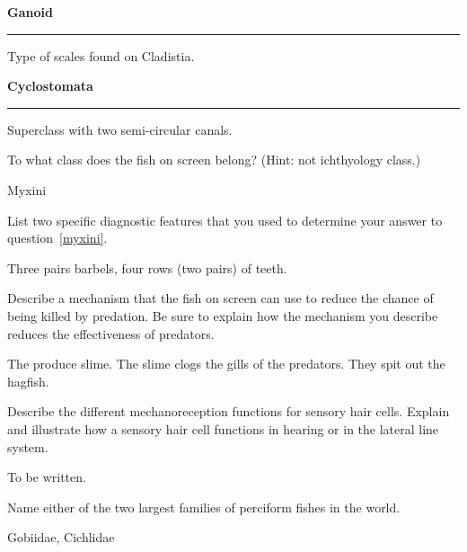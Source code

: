 \documentclass[11pt, addpoints]{exam}
\newcommand*\Matching[1]{
\ifprintanswers
	\textbf{#1}
\else
	\rule{2.1in}{0.5pt}
\fi
}
\newlength\matchlena
\newlength\matchlenb
\newcommand\MatchQuestion[2]{%
	\setlength\matchlenb{\linewidth}
	\addtolength\matchlenb{-\matchlena}
	\parbox[t]{\matchlena}{\Matching{#1}}\enspace\parbox[t]{\matchlenb}{#2}}
\begin{document}
\begin{questions}
\question\MatchQuestion{Ganoid}{Type of scales found on Cladistia.}
\vspace{0.5\baselineskip}

\question\MatchQuestion{Cyclostomata}{Superclass with two semi-circular canals.}
\vspace{0.5\baselineskip}

\newpage


\question[1]\label{myxini}
To what class does the fish on screen belong? (Hint: not ichthyology class.) 
\begin{solution}Myxini\end{solution}

\question[4]
List two specific diagnostic features that you used to determine your answer to question~\ref{myxini}.
\begin{solution}Three pairs barbels, four rows (two pairs) of teeth.\end{solution}


\question[4]
Describe a mechanism that the fish on screen can use to reduce the chance of being killed by predation.  Be sure to explain how the mechanism you describe reduces the effectiveness of predators.

\begin{solution}
The produce slime. The slime clogs the gills of the predators. They spit out the hagfish.
\end{solution}


\question[10]
Describe the different mechanoreception functions for sensory hair cells.  Explain and illustrate how a sensory hair cell functions in hearing or in the lateral line system.

\begin{solution}
To be written.
\end{solution}


\bonusquestion[1]
Name either of the two largest families of perciform fishes in the world.
\begin{solution}Gobiidae, Cichlidae\end{solution}


\end{questions}
\end{document}
